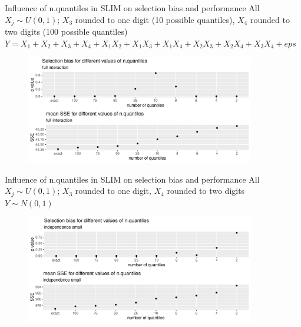 \documentclass[9pt, xcolor=table]{beamer}
\begin{document}
\begin{frame}{Influence of n.quantiles in SLIM on selection bias and performance}
All $X_j \sim U(0,1)$; $X_3$ rounded to one digit (10 possible quantiles), $X_4$ rounded to two digits (100 possible quantiles)\\
$Y = X_1 + X_2 + X_3 + X_4 + X_1 X_2 + X_1 X_3 + X_1 X_4 + X_2 X_3 + X_2 X_4 + X_3 X_4 + eps$

\begin{figure}
    \includegraphics[width=10cm]{Figures/simulations/batchtools/selection_bias_slim/full_interaction.pdf}
\end{figure}

\end{frame}


\begin{frame}{Influence of n.quantiles in SLIM on selection bias and performance}
All $X_j \sim U(0,1)$; $X_3$ rounded to one digit, $X_4$ rounded to two digits\\
$Y \sim N(0,1)$
\begin{figure}
    \includegraphics[width=10cm]{Figures/simulations/batchtools/selection_bias_slim/independence_small.pdf}
\end{figure}
\end{frame}
\end{document}

